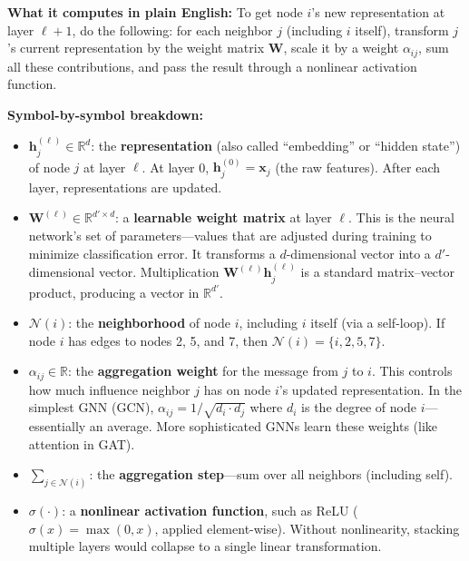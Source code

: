 \documentclass[11pt,a4paper]{article}
\newcommand{\R}{\mathbb{R}}
\newcommand{\N}{\mathcal{N}}
\newcommand{\bW}{\mathbf{W}}
\newcommand{\bx}{\mathbf{x}}
\newcommand{\bh}{\mathbf{h}}
\theoremstyle{definition}
\theoremstyle{plain}
\begin{document}
\textbf{What it computes in plain English:}
To get node $i$'s new representation at layer $\ell+1$, do the following: for each
neighbor $j$ (including $i$ itself), transform $j$'s current representation by the
weight matrix $\bW$, scale it by a weight $\alpha_{ij}$, sum all these contributions,
and pass the result through a nonlinear activation function.

\textbf{Symbol-by-symbol breakdown:}
\begin{itemize}
  \item $\bh_j^{(\ell)} \in \R^d$: the \textbf{representation} (also called
    ``embedding'' or ``hidden state'') of node $j$ at layer $\ell$.
    At layer 0, $\bh_j^{(0)} = \bx_j$ (the raw features).
    After each layer, representations are updated.

  \item $\bW^{(\ell)} \in \R^{d' \times d}$: a \textbf{learnable weight matrix}
    at layer $\ell$.
    This is the neural network's set of parameters---values that are adjusted
    during training to minimize classification error.
    It transforms a $d$-dimensional vector into a $d'$-dimensional vector.
    Multiplication $\bW^{(\ell)} \bh_j^{(\ell)}$ is a standard matrix--vector
    product, producing a vector in $\R^{d'}$.

  \item $\N(i)$: the \textbf{neighborhood} of node $i$, including $i$ itself
    (via a self-loop).
    If node $i$ has edges to nodes 2, 5, and 7, then $\N(i) = \{i, 2, 5, 7\}$.

  \item $\alpha_{ij} \in \R$: the \textbf{aggregation weight} for the message from
    $j$ to $i$.
    This controls how much influence neighbor $j$ has on node $i$'s updated
    representation.
    In the simplest GNN (GCN), $\alpha_{ij} = 1/\sqrt{d_i \cdot d_j}$ where $d_i$
    is the degree of node $i$---essentially an average.
    More sophisticated GNNs learn these weights (like attention in GAT).

  \item $\sum_{j \in \N(i)}$: the \textbf{aggregation step}---sum over all
    neighbors (including self).

  \item $\sigma(\cdot)$: a \textbf{nonlinear activation function}, such as
    ReLU ($\sigma(x) = \max(0, x)$, applied element-wise).
    Without nonlinearity, stacking multiple layers would collapse to a single
    linear transformation.
\end{itemize}
\end{document}
